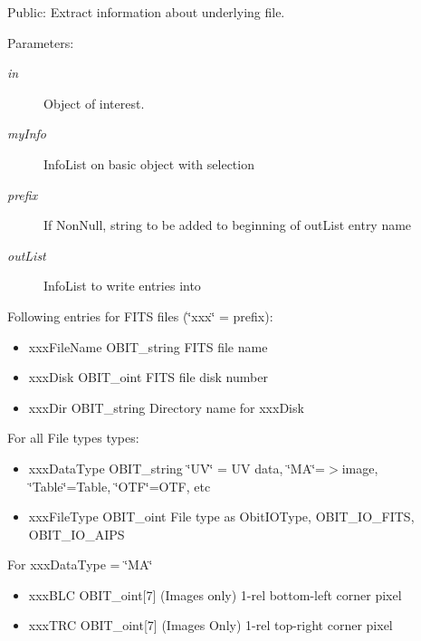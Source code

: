 Public: Extract information about underlying file. 

\begin{Desc}
\item[Parameters:]
\begin{description}
\item[{\em in}]Object of interest. \item[{\em my\-Info}]Info\-List on basic object with selection \item[{\em prefix}]If Non\-Null, string to be added to beginning of out\-List entry name \item[{\em out\-List}]Info\-List to write entries into\end{description}
\end{Desc}
Following entries for FITS files (\char`\"{}xxx\char`\"{} = prefix): \begin{itemize}
\item xxx\-File\-Name OBIT\_\-string FITS file name \item xxx\-Disk OBIT\_\-oint FITS file disk number \item xxx\-Dir OBIT\_\-string Directory name for xxx\-Disk\end{itemize}
For all File types types: \begin{itemize}
\item xxx\-Data\-Type OBIT\_\-string \char`\"{}UV\char`\"{} = UV data, \char`\"{}MA\char`\"{}=$>$image, \char`\"{}Table\char`\"{}=Table, \char`\"{}OTF\char`\"{}=OTF, etc \item xxx\-File\-Type OBIT\_\-oint File type as Obit\-IOType, OBIT\_\-IO\_\-FITS, OBIT\_\-IO\_\-AIPS\end{itemize}
For xxx\-Data\-Type = \char`\"{}MA\char`\"{} \begin{itemize}
\item xxx\-BLC OBIT\_\-oint[7] (Images only) 1-rel bottom-left corner pixel \item xxx\-TRC OBIT\_\-oint[7] (Images Only) 1-rel top-right corner pixel 
\end{itemize}
